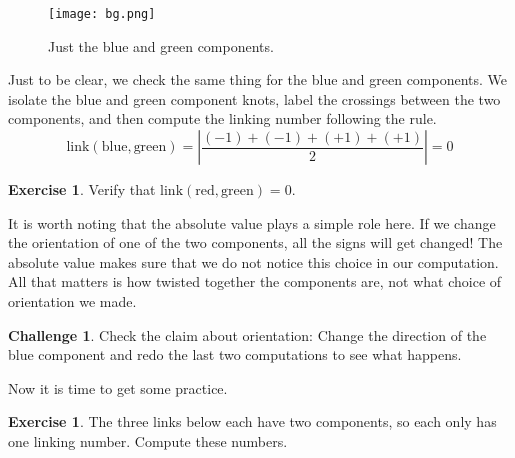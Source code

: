 \documentclass[12pt,letterpaper]{article}
\theoremstyle{definition}
\newtheorem{exercise}[question]{Exercise}
\newtheorem*{challenge}{Challenge}
\begin{document}
\begin{figure}
    \centering
    \texttt{[image: bg.png]}
    \caption{Just the blue and green components.}
\end{figure}

\vspace{1in}

Just to be clear, we check the same thing for the blue and green components.
We isolate the blue and green component knots, label the crossings between the two components, and then compute the linking number following the rule.
\[
\mathrm{link}(\text{blue},\text{green}) = \left| \dfrac{ (-1)+(-1)+(+1)+(+1)}{2}\right| = 0
\]


\begin{exercise}
Verify that $\mathrm{link}(\text{red},\text{green}) = 0$.
\end{exercise}


It is worth noting that the absolute value plays a simple role here.
If we change the orientation of one of the two components, all the signs will get changed!
The absolute value makes sure that we do not notice this choice in our computation.
All that matters is how twisted together the components are, not what choice of orientation we made.

\begin{challenge}
Check the claim about orientation: 
Change the direction of the blue component and redo the last two computations to see what happens.
\end{challenge}


\clearpage

Now it is time to get some practice.

\begin{exercise} 
The three links below each have two components, so each only has one linking number.
Compute these numbers.
\end{exercise}
\end{document}
